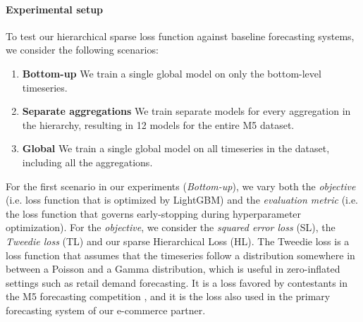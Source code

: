 \documentclass[preprint, 3p, times, twocolumn]{elsarticle}
\begin{document}
  \paragraph{Experimental setup} To test our hierarchical sparse loss function against baseline forecasting systems, we consider the following scenarios:
  \begin{enumerate}
    \item \textbf{Bottom-up} We train a single global model on only the bottom-level timeseries.
    \item \textbf{Separate aggregations} We train separate models for every aggregation in the hierarchy, resulting in 12 models for the entire M5 dataset.
    \item \textbf{Global} We train a single global model on all timeseries in the dataset, including all the aggregations.
  \end{enumerate}
  For the first scenario in our experiments (\textit{Bottom-up}), we vary both the \textit{objective} (i.e. loss function that is optimized by LightGBM) and the \textit{evaluation metric} (i.e. the loss function that governs early-stopping during hyperparameter optimization). For the \textit{objective}, we consider the \textit{squared error loss} (SL), the \textit{Tweedie loss} (TL) and our sparse Hierarchical Loss (HL). The Tweedie loss is a loss function that assumes that the timeseries follow a distribution somewhere in between a Poisson and a Gamma distribution, which is useful in zero-inflated settings such as retail demand forecasting. It is a loss favored by contestants in the M5 forecasting competition \cite{januschowski_forecasting_2022}, and it is the loss also used in the primary forecasting system of our e-commerce partner.
\end{document}
